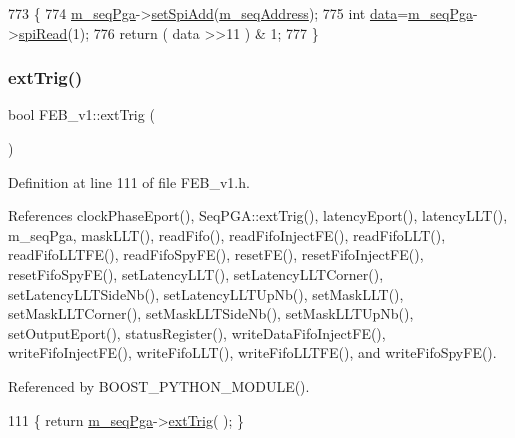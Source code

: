 \begin{DoxyCode}
773                              \{
774   \hyperlink{classFEB__v1_a6c7804ac86796f233a8393043adf2e77}{m\_seqPga}->\hyperlink{classSeqPGA_ac998ce3a6d9b5f2e88cc8393f8c1df53}{setSpiAdd}(\hyperlink{classFEB__v1_a1c1eb093fd1733b9510fcf8bc5c7ad08}{m\_seqAddress});
775   \textcolor{keywordtype}{int} \hyperlink{classFEB__v1_a6bca4320bd3bbbc32efc81097f33421a}{data}=\hyperlink{classFEB__v1_a6c7804ac86796f233a8393043adf2e77}{m\_seqPga}->\hyperlink{classSeqPGA_ab3d0e5e5d4014bc7a92588a76b8713d4}{spiRead}(1);
776   \textcolor{keywordflow}{return} ( data >>11 ) & 1;
777 \}
\end{DoxyCode}
\mbox{\label{classFEB__v1_a481e089490ae958c7606f11d27c9db9a}} 
\subsubsection{\texorpdfstring{ext\+Trig()}{extTrig()}}
{\footnotesize\ttfamily bool F\+E\+B\+\_\+v1\+::ext\+Trig (\begin{DoxyParamCaption}{ }\end{DoxyParamCaption})\hspace{0.3cm}{\ttfamily [inline]}}



Definition at line 111 of file F\+E\+B\+\_\+v1.\+h.



References clock\+Phase\+Eport(), Seq\+P\+G\+A\+::ext\+Trig(), latency\+Eport(), latency\+L\+L\+T(), m\+\_\+seq\+Pga, mask\+L\+L\+T(), read\+Fifo(), read\+Fifo\+Inject\+F\+E(), read\+Fifo\+L\+L\+T(), read\+Fifo\+L\+L\+T\+F\+E(), read\+Fifo\+Spy\+F\+E(), reset\+F\+E(), reset\+Fifo\+Inject\+F\+E(), reset\+Fifo\+Spy\+F\+E(), set\+Latency\+L\+L\+T(), set\+Latency\+L\+L\+T\+Corner(), set\+Latency\+L\+L\+T\+Side\+Nb(), set\+Latency\+L\+L\+T\+Up\+Nb(), set\+Mask\+L\+L\+T(), set\+Mask\+L\+L\+T\+Corner(), set\+Mask\+L\+L\+T\+Side\+Nb(), set\+Mask\+L\+L\+T\+Up\+Nb(), set\+Output\+Eport(), status\+Register(), write\+Data\+Fifo\+Inject\+F\+E(), write\+Fifo\+Inject\+F\+E(), write\+Fifo\+L\+L\+T(), write\+Fifo\+L\+L\+T\+F\+E(), and write\+Fifo\+Spy\+F\+E().



Referenced by B\+O\+O\+S\+T\+\_\+\+P\+Y\+T\+H\+O\+N\+\_\+\+M\+O\+D\+U\+L\+E().


\begin{DoxyCode}
111 \{ \textcolor{keywordflow}{return} \hyperlink{classFEB__v1_a6c7804ac86796f233a8393043adf2e77}{m\_seqPga}->\hyperlink{classSeqPGA_ae2e0917c379649d106539cc3b8b9ca3c}{extTrig}( ); \}
\end{DoxyCode}
\mbox{\label{classFEB__v1_a6b05c21a70fbb2e88f8e1f991a117b49}} 
